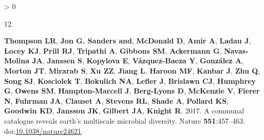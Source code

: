 \documentclass[
]{article}
\newlength{\cslhangindent}
\newlength{\csllabelwidth}
\newenvironment{CSLReferences}[3] %
 {%
  \setlength{\parindent}{0pt}
  \ifodd #1 \everypar{\setlength{\hangindent}{\cslhangindent}}\ignorespaces\fi
  \ifnum #2 > 0
  \setlength{\parskip}{#2\baselineskip}
  \fi
 }%
 {}
\newcommand{\CSLLeftMargin}[1]{\parbox[t]{\csllabelwidth}{#1}}
\newcommand{\CSLRightInline}[1]{\parbox[t]{\linewidth - \csllabelwidth}{#1}}
\begin{document}
\begin{CSLReferences}{0}{0}
\leavevmode\hypertarget{ref-Thompson2017}{}%
\CSLLeftMargin{12. }
\CSLRightInline{\textbf{Thompson LR}, \textbf{Jon G. Sanders and},
\textbf{McDonald D}, \textbf{Amir A}, \textbf{Ladau J}, \textbf{Locey
KJ}, \textbf{Prill RJ}, \textbf{Tripathi A}, \textbf{Gibbons SM},
\textbf{Ackermann G}, \textbf{Navas-Molina JA}, \textbf{Janssen S},
\textbf{Kopylova E}, \textbf{Vázquez-Baeza Y}, \textbf{González A},
\textbf{Morton JT}, \textbf{Mirarab S}, \textbf{Xu ZZ}, \textbf{Jiang
L}, \textbf{Haroon MF}, \textbf{Kanbar J}, \textbf{Zhu Q}, \textbf{Song
SJ}, \textbf{Kosciolek T}, \textbf{Bokulich NA}, \textbf{Lefler J},
\textbf{Brislawn CJ}, \textbf{Humphrey G}, \textbf{Owens SM},
\textbf{Hampton-Marcell J}, \textbf{Berg-Lyons D}, \textbf{McKenzie V},
\textbf{Fierer N}, \textbf{Fuhrman JA}, \textbf{Clauset A},
\textbf{Stevens RL}, \textbf{Shade A}, \textbf{Pollard KS},
\textbf{Goodwin KD}, \textbf{Jansson JK}, \textbf{Gilbert JA},
\textbf{Knight R}. 2017. A communal catalogue reveals earth's multiscale
microbial diversity. Nature \textbf{551}:457--463.
doi:\href{https://doi.org/10.1038/nature24621}{10.1038/nature24621}.}


\end{CSLReferences}
\end{document}

